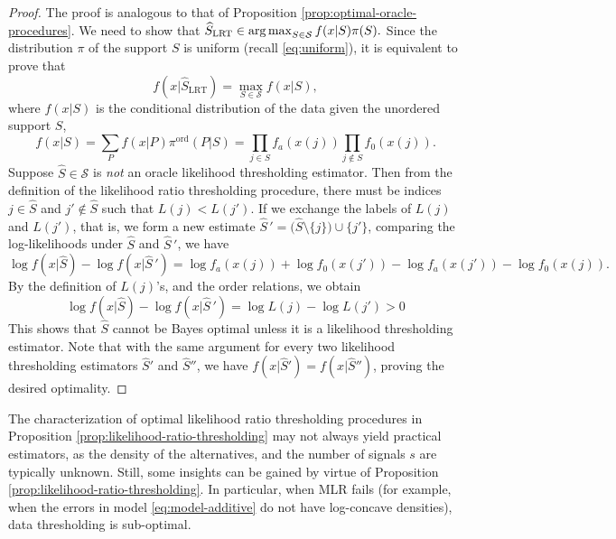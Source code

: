 \begin{proof}%
The proof is analogous to that of Proposition \ref{prop:optimal-oracle-procedures}.
We need to show that
$
\widehat{S}_{\rm LRT} \in \operatorname*{arg\,max}_{S \in \mathcal{S}} f(x|S) \pi(S).
$
Since the distribution $\pi$ of the support $S$ 
is uniform (recall \eqref{eq:uniform}), it is equivalent to prove that 
$$
f(x|\widehat{S}_{\text{LRT}}) = \max_{S \in \mathcal {S}} f(x|S),
$$ 
where  $f(x|S)$ is the conditional distribution of the data given the unordered support $S$,
\begin{equation} \label{eq:likelihood-ratio-thresholding-proof}
    f(x|S) = \sum_P f(x|P) \pi^{\text{ord}}(P|S) = \prod_{j\in S} f_a(x(j)) \prod_{j\not\in S}{f_0(x(j))}.
\end{equation}
Suppose $\widehat S\in {\mathcal S}$ is {\em not} an oracle likelihood thresholding estimator. 
Then from the definition of the likelihood ratio thresholding procedure, there 
must be indices 
$j \in \widehat S$ and $j' \not \in \widehat{S}$ such that $L(j) < L(j')$.
If we exchange the labels of $L(j)$ and $L(j')$, that is, we form a new estimate 
$\widehat{S}\,' = \big(\widehat{S}\setminus\{j\}\big)\cup\{j'\}$,
comparing the log-likelihoods under $\widehat{S}$ and $\widehat{S}\,'$, we have
\begin{equation*}
    \log{f(x|\widehat{S})} - \log{f(x|\widehat{S}\,')} 
    = \log{f_a(x(j))} + \log{f_0(x(j'))} - \log{f_a(x(j'))} - \log{f_0(x(j))}.
\end{equation*}
By the definition of $L(j)$'s, and the order relations, we obtain
\begin{equation*}
    \log{f(x|\widehat{S})} - \log{f(x|\widehat{S}\,')} 
    = \log{L(j)} - \log{L(j')} > 0
\end{equation*}
This shows that $\widehat S$ cannot be Bayes optimal unless it is a likelihood thresholding estimator.
Note that with the same argument for every two likelihood thresholding estimators $\widehat S'$
and $\widehat S''$, we have $ f(x|\widehat{S}') = f(x|\widehat{S}'')$, proving the desired optimality.
\end{proof}


The characterization of optimal likelihood ratio thresholding procedures in Proposition \ref{prop:likelihood-ratio-thresholding} may not always yield practical estimators, as the density of the alternatives, and the number of signals $s$ 
are typically unknown. Still, some insights can be gained by virtue of Proposition \ref{prop:likelihood-ratio-thresholding}.
In particular, when MLR fails (for example, when the errors in model \eqref{eq:model-additive} do not have log-concave densities), data thresholding is sub-optimal. 


